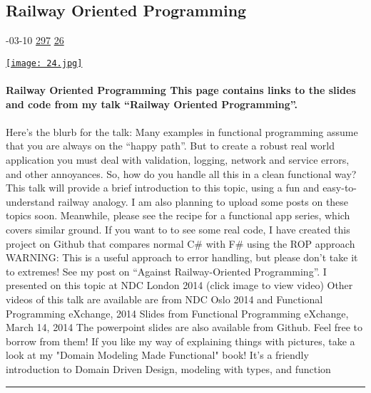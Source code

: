\documentclass[10pt,a4paper]{article}
\begin{document}
\begin{multicols}{2}
\begin{minipage}{\linewidth}
\subsection{Railway Oriented Programming}
\textsc{\footnotesize
{\scriptsize\faCalendar}-03-10 
{\scriptsize\faThumbsOUp}\space 
\href{http://news.ycombinator.com/item?id=37171943\&utm\_term=comment}{297} 
{\scriptsize\faComments}\space 
\href{http://news.ycombinator.com/item?id=37171943\&utm\_term=comment}{26} 
}
\par\medskip\noindent
\href{https://fsharpforfunandprofit.com/rop/?utm\_source=hackernewsletter\&utm\_medium=email\&utm\_term=code}{
    \texttt{[image: 24.jpg]}
}
\end{minipage}
\paragraph{}
\textbf{Railway Oriented Programming
This page contains links to the slides and code from my talk “Railway Oriented Programming”.}
\paragraph{}

Here’s the blurb for the talk:
Many examples in functional programming assume that you are always on the “happy path”. But to create a robust real world application you must deal with validation, logging, network and service errors, and other annoyances.
So, how do you handle all this in a clean functional way?
This talk will provide a brief introduction to this topic, using a fun and easy-to-understand railway analogy.
I am also planning to upload some posts on these topics soon. Meanwhile, please see the recipe for a functional app series, which covers similar ground.
If you want to to see some real code, I have created this project on Github that compares normal C\# with F\# using the ROP approach
WARNING: This is a useful approach to error handling, but please don’t take it to extremes! See my post on “Against Railway-Oriented Programming”.
I presented on this topic at NDC London 2014 (click image to view video)
Other videos of this talk are available are from NDC Oslo 2014 and Functional Programming eXchange, 2014
Slides from Functional Programming eXchange, March 14, 2014
The powerpoint slides are also available from Github. Feel free to borrow from them!
If you like my way of explaining things with pictures, take a look at my "Domain Modeling Made Functional" book! It's a friendly introduction to Domain Driven Design, modeling with types, and function
\par\noindent\textcolor{red}{\rule{\linewidth}{0.2mm}}
\vfill
\null
\noindent\begin{minipage}{\linewidth}

\end{minipage}
\end{multicols}
\end{document}
